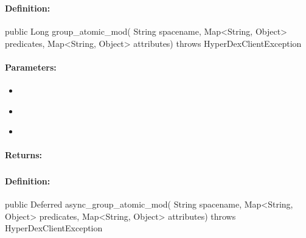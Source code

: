 \subsubsection{}
\label{api:java:group_atomic_mod}


\paragraph{Definition:}
\begin{javacode}
public Long group_atomic_mod(
        String spacename,
        Map<String, Object> predicates,
        Map<String, Object> attributes) throws HyperDexClientException
\end{javacode}

\paragraph{Parameters:}
\begin{itemize}[noitemsep]
\item {}\\

\item {}\\

\item {}\\

\end{itemize}

\paragraph{Returns:}


\pagebreak
\subsubsection{}
\label{api:java:async_group_atomic_mod}


\paragraph{Definition:}
\begin{javacode}
public Deferred async_group_atomic_mod(
        String spacename,
        Map<String, Object> predicates,
        Map<String, Object> attributes) throws HyperDexClientException
\end{javacode}

